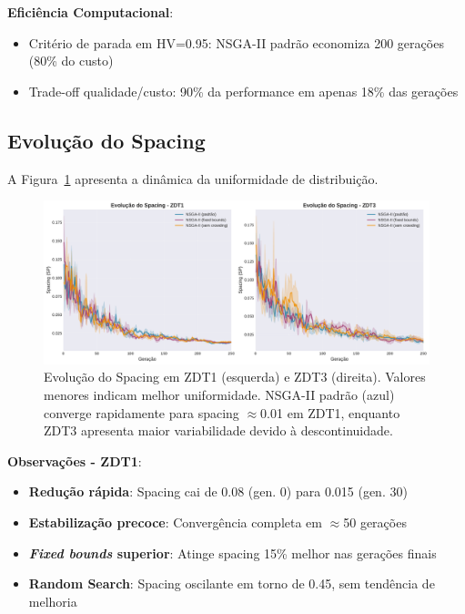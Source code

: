 \textbf{Eficiência Computacional}:
\begin{itemize}
    \item Critério de parada em HV=0.95: NSGA-II padrão economiza 200 gerações (80\% do custo)
    \item Trade-off qualidade/custo: 90\% da performance em apenas 18\% das gerações
\end{itemize}

\subsection{Evolução do Spacing}

A Figura~\ref{fig:spacing_evolution} apresenta a dinâmica da uniformidade de distribuição.

\begin{figure}[H]
    \centering
    \includegraphics[width=\textwidth]{../plots/F_spacing_evolution.pdf}
    \caption{Evolução do Spacing em ZDT1 (esquerda) e ZDT3 (direita). Valores menores indicam melhor uniformidade. NSGA-II padrão (azul) converge rapidamente para spacing $\approx$0.01 em ZDT1, enquanto ZDT3 apresenta maior variabilidade devido à descontinuidade.}
    \label{fig:spacing_evolution}
\end{figure}

\textbf{Observações - ZDT1}:
\begin{itemize}
    \item \textbf{Redução rápida}: Spacing cai de 0.08 (gen. 0) para 0.015 (gen. 30)
    \item \textbf{Estabilização precoce}: Convergência completa em $\approx$50 gerações
    \item \textbf{\textit{Fixed bounds} superior}: Atinge spacing 15\% melhor nas gerações finais
    \item \textbf{Random Search}: Spacing oscilante em torno de 0.45, sem tendência de melhoria
\end{itemize}

